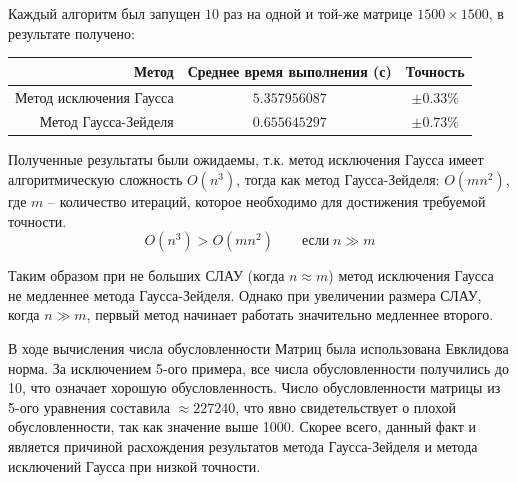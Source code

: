 \documentclass[a4paper]{article}
\begin{document}
Каждый алгоритм был запущен $10$ раз на одной и той-же матрице $1500 \times 1500$, в результате получено:
\begin{center}
    \begin{tabular}{r|cc}
        Метод & Среднее время выполнения (с) & Точность \\
        \hline
        Метод исключения Гаусса & $5.357956087$ & $\pm 0.33\%$ \\
        Метод Гаусса-Зейделя    & $0.655645297$ & $\pm 0.73\%$ \\
    \end{tabular}
\end{center}

Полученные результаты были ожидаемы, т.к. метод исключения Гаусса имеет алгоритмическую сложность $O(n^3)$, тогда как метод Гаусса-Зейделя: $O(mn^2)$, где $m$ -- количество итераций, которое необходимо для достижения требуемой точности.
\begin{equation*}
    O(n^3) > O(mn^2) \qquad \text{если} \; n \gg m
\end{equation*}

Таким образом при не больших СЛАУ (когда $n \approx m$) метод исключения Гаусса не медленнее метода Гаусса-Зейделя. Однако при увеличении размера СЛАУ, когда $n \gg m$, первый метод начинает работать значительно медленнее второго.

\bigskip

В ходе вычисления числа обусловленности Матриц была использована Евклидова норма. За исключением 5-ого примера, все числа обусловленности получились до 10, что означает хорошую обусловленность.
Число обусловленности матрицы из 5-ого уравнения составила $\approx 227240$, что явно свидетельствует о плохой обусловленности, так как значение выше 1000. Скорее всего, данный факт и является причиной расхождения результатов метода Гаусса-Зейделя и метода исключений Гаусса при низкой точности.
\end{document}
